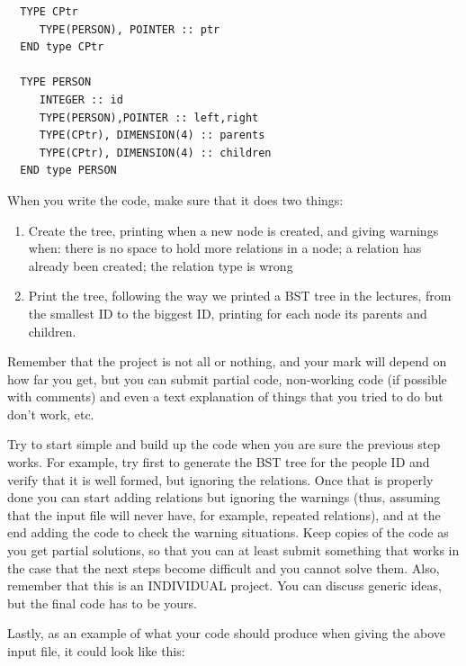 \begin{verbatim}
  TYPE CPtr
     TYPE(PERSON), POINTER :: ptr
  END type CPtr
  
  TYPE PERSON
     INTEGER :: id
     TYPE(PERSON),POINTER :: left,right
     TYPE(CPtr), DIMENSION(4) :: parents
     TYPE(CPtr), DIMENSION(4) :: children
  END type PERSON
\end{verbatim}

When you write the code, make sure that it does two things:

\begin{enumerate}
\item Create the tree, printing when a new node is created, and giving warnings when:
 there is no space to hold more relations in a node; a relation has already been
 created; the relation type is wrong
\item Print the tree, following the way we printed a BST tree in the lectures,
 from the smallest ID to the biggest ID, printing for each node its parents and children. 
\end{enumerate}

Remember that the project is not all or nothing, and your mark will depend on
how far you get, but you can submit partial code, non-working code (if possible
with comments) and even a text explanation of things that you tried to do but
don't work, etc.

Try to start simple and build up the code when you are sure the previous step
works. For example, try first to generate the BST tree for the people
ID and verify that it is well formed, but ignoring the relations. Once that
is properly done you can start adding relations but ignoring the warnings
(thus, assuming that the input file will never have, for example, repeated relations),
and at the end adding the code to check the warning situations. Keep copies of
the code as you get partial solutions, so that you can at least submit something
that works in the case that the next steps become difficult and you cannot solve
them. Also, remember that this is an INDIVIDUAL project. You can discuss generic
ideas, but the final code has to be yours. 


Lastly, as an example of what your code should produce when giving the above
input file, it could look like this:

